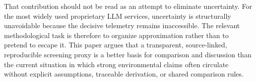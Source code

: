 \documentclass[10pt,a4paper]{article}
\begin{document}
That contribution should not be read as an attempt to eliminate uncertainty. For the most widely used proprietary LLM services, uncertainty is structurally unavoidable because the decisive telemetry remains inaccessible. The relevant methodological task is therefore to organize approximation rather than to pretend to escape it. This paper argues that a transparent, source-linked, reproducible screening proxy is a better basis for comparison and discussion than the current situation in which strong environmental claims often circulate without explicit assumptions, traceable derivation, or shared comparison rules.



\end{document}
